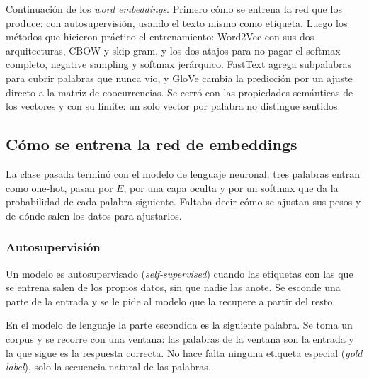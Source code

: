 \documentclass[11pt,letterpaper]{article}
\begin{document}

\begin{quick_sum}
    Continuación de los \textit{word embeddings}. Primero cómo se
    entrena la red que los produce: con autosupervisión, usando el
    texto mismo como etiqueta. Luego los métodos que hicieron práctico
    el entrenamiento: Word2Vec con sus dos arquitecturas, CBOW y
    skip-gram, y los dos atajos para no pagar el softmax completo,
    negative sampling y softmax jerárquico. FastText agrega
    subpalabras para cubrir palabras que nunca vio, y GloVe cambia la
    predicción por un ajuste directo a la matriz de coocurrencias. Se
    cerró con las propiedades semánticas de los vectores y con su
    límite: un solo vector por palabra no distingue sentidos.
\end{quick_sum}

\subsection*{Cómo se entrena la red de embeddings}

La clase pasada terminó con el modelo de lenguaje neuronal: tres
palabras entran como one-hot, pasan por $E$, por una capa oculta y por
un softmax que da la probabilidad de cada palabra siguiente. Faltaba
decir cómo se ajustan sus pesos y de dónde salen los datos para
ajustarlos.

\subsubsection*{Autosupervisión}

\begin{definicion}
    Un modelo es autosupervisado (\textit{self-supervised}) cuando las
    etiquetas con las que se entrena salen de los propios datos, sin
    que nadie las anote. Se esconde una parte de la entrada y se le
    pide al modelo que la recupere a partir del resto.
\end{definicion}

En el modelo de lenguaje la parte escondida es la siguiente palabra.
Se toma un corpus y se recorre con una ventana: las palabras de la
ventana son la entrada y la que sigue es la respuesta correcta. No
hace falta ninguna etiqueta especial (\textit{gold label}), solo la
secuencia natural de las palabras.
\end{document}

